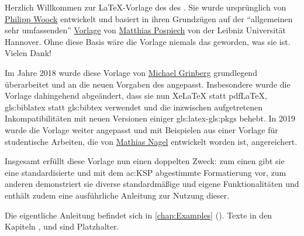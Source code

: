 %
%
%
%
%
%
Herzlich Willkommen zur \LaTeX-Vorlage
des  %
des . %
Sie wurde ursprünglich von
\href{https://ies.iar.kit.edu/1473_1575.php}{Philipp Woock}
entwickelt und basiert in ihren Grundzügen auf der \enquote{allgemeinen sehr umfassenden}
\href{http://www.matthiaspospiech.de/latex/templates/thesis/}{Vorlage} von 
\href{http://www.matthiaspospiech.de}{Matthias Pospiech} von der Leibniz Universität Hannover.
Ohne diese Basis wäre die Vorlage niemals das geworden, was sie ist. Vielen Dank!

Im Jahre 2018 wurde diese Vorlage von
\href{https://ies.iar.kit.edu/1473_1650.php}{Michael Grinberg}
grundlegend überarbeitet und an die neuen Vorgaben des  angepasst.
Insbesondere wurde die Vorlage dahingehend abgeändert, dass sie nun XeLaTeX statt pdfLaTeX, 
\gls{gls:biblatex} statt \gls{gls:bibtex} verwendet und die inzwischen aufgetretenen
Inkompatibilitäten mit neuen Versionen einiger \gls{gls:latex}-\glspl{gls:pkg} behebt.
In 2019 wurde die Vorlage weiter angepasst und mit Beispielen aus einer Vorlage
für studentische Arbeiten, die von
\href{https://crypto.iti.kit.edu/alumni_matthias_nagel.php}{Mathias Nagel}
entwickelt worden ist, angereichert.

Insgesamt erfüllt diese Vorlage nun einen doppelten Zweck:
zum einen gibt sie eine standardisierte und mit dem \gls{ac:KSP}
abgestimmte Formatierung vor, zum anderen demonstriert sie diverse
standardmäßige und eigene Funktionalitäten und enthält zudem
eine ausführliche Anleitung zur Nutzung dieser.

Die eigentliche Anleitung befindet sich in \cref{chap:Examples} ().
Texte in den Kapiteln ,  und  sind Platzhalter.

